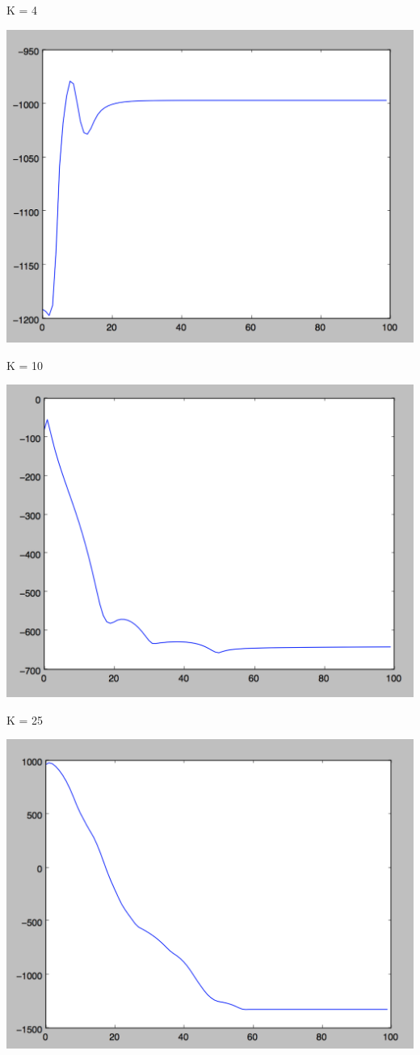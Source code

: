 \documentclass[twoside,11pt]{homework}
\begin{document}
K = 4

\includegraphics[scale=.5]{images/vi_4_obj.png}

K = 10

\includegraphics[scale=.5]{images/vi_10_obj.png}

K = 25

\includegraphics[scale=.5]{images/vi_25_obj.png}
\end{document}
